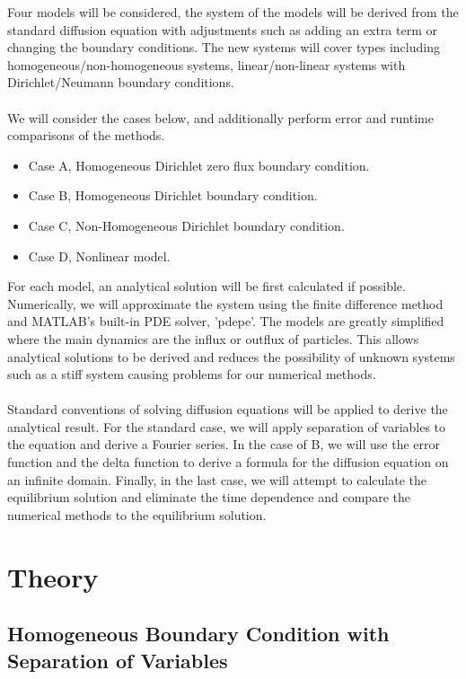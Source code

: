 \documentclass{article}
\begin{document}
Four models will be considered, the system of the models will be derived from the standard diffusion equation with adjustments such as adding an extra term or changing the boundary conditions. The new systems will cover types including homogeneous/non-homogeneous systems, linear/non-linear systems with Dirichlet/Neumann boundary conditions.
\\
\\
We will consider the cases below, and additionally perform error and runtime comparisons of the methods.
\begin{itemize}
\item Case A, Homogeneous Dirichlet zero flux boundary condition.
\item Case B, Homogeneous Dirichlet boundary condition.
\item Case C, Non-Homogeneous Dirichlet boundary condition.
\item Case D, Nonlinear model.
\end{itemize}

For each model, an analytical solution will be first calculated if possible. Numerically, we will approximate the system using the finite difference method and MATLAB's built-in PDE solver, 'pdepe'. The models are greatly simplified where the main dynamics are the influx or outflux of particles. This allows analytical solutions to be derived and reduces the possibility of unknown systems such as a stiff system causing problems for our numerical methods.
\\
\\
Standard conventions of solving diffusion equations will be applied to derive the analytical result. For the standard case, we will apply separation of variables to the equation and derive a Fourier series. In the case of B, we will use the error function and the delta function to derive a formula for the diffusion equation on an infinite domain. Finally, in the last case, we will attempt to calculate the equilibrium solution and eliminate the time dependence and compare the numerical methods to the equilibrium solution.
	

\section{Theory}

\subsection{Homogeneous Boundary Condition with Separation of Variables}
\end{document}
